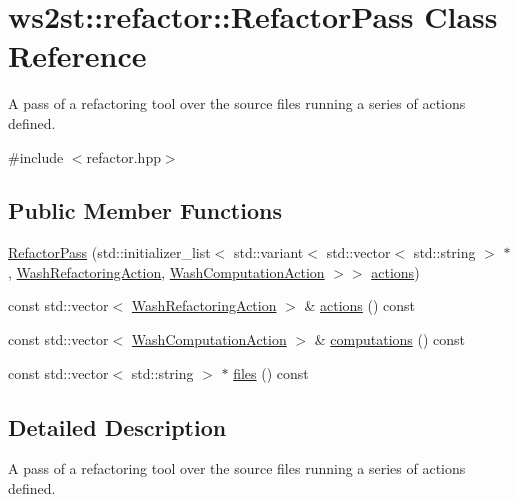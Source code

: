 \hypertarget{classws2st_1_1refactor_1_1RefactorPass}{}\section{ws2st\+:\+:refactor\+:\+:Refactor\+Pass Class Reference}
\label{classws2st_1_1refactor_1_1RefactorPass}


A pass of a refactoring tool over the source files running a series of actions defined.  




{\ttfamily \#include $<$refactor.\+hpp$>$}

\subsection*{Public Member Functions}
\begin{DoxyCompactItemize}
\item 
\mbox{\hyperlink{classws2st_1_1refactor_1_1RefactorPass_a2e7cff9227709e40ebda3cb4acfc8fb4}{Refactor\+Pass}} (std\+::initializer\+\_\+list$<$ std\+::variant$<$ std\+::vector$<$ std\+::string $>$ $\ast$, \mbox{\hyperlink{classws2st_1_1refactor_1_1WashRefactoringAction}{Wash\+Refactoring\+Action}}, \mbox{\hyperlink{classws2st_1_1refactor_1_1WashComputationAction}{Wash\+Computation\+Action}} $>$$>$ \mbox{\hyperlink{classws2st_1_1refactor_1_1RefactorPass_a349d409f7570c2516f690b8fe17ad20f}{actions}})
\item 
const std\+::vector$<$ \mbox{\hyperlink{classws2st_1_1refactor_1_1WashRefactoringAction}{Wash\+Refactoring\+Action}} $>$ \& \mbox{\hyperlink{classws2st_1_1refactor_1_1RefactorPass_a349d409f7570c2516f690b8fe17ad20f}{actions}} () const
\item 
const std\+::vector$<$ \mbox{\hyperlink{classws2st_1_1refactor_1_1WashComputationAction}{Wash\+Computation\+Action}} $>$ \& \mbox{\hyperlink{classws2st_1_1refactor_1_1RefactorPass_aa92ed5b7adb785f3cfb42f41b1a003e4}{computations}} () const
\item 
const std\+::vector$<$ std\+::string $>$ $\ast$ \mbox{\hyperlink{classws2st_1_1refactor_1_1RefactorPass_ac1c2e95b13d25ee91b5aa9c065296884}{files}} () const
\end{DoxyCompactItemize}


\subsection{Detailed Description}
A pass of a refactoring tool over the source files running a series of actions defined. 

